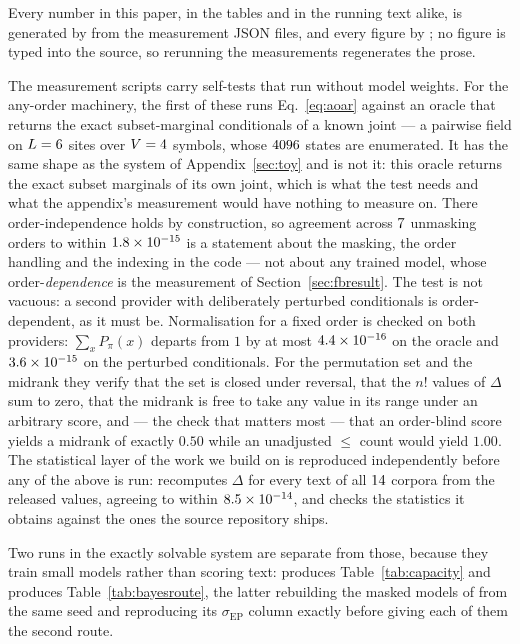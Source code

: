 \documentclass[11pt]{article}
\newcommand{\sigEP}{\sigma_{\mathrm{EP}}}
\begin{document}
Every number in this paper, in the tables and in the running text alike, is
generated by  from the measurement JSON files, and every
figure by ; no figure is typed into the source, so
rerunning the measurements regenerates the prose.

The measurement scripts carry self-tests that run without model weights.
For the any-order machinery, the first of these runs
Eq.~\eqref{eq:aoar} against an oracle that returns the exact
subset-marginal conditionals of a known joint --- a pairwise field on $L =
6$ sites over $V = 4$ symbols, whose $4096$ states are
enumerated.  It has the same shape as the system of
Appendix~\ref{sec:toy} and is not it: this oracle returns the exact subset
marginals of its own joint, which is what the test needs and what the
appendix's measurement would have nothing to measure on.  There
order-independence holds by construction, so agreement across
$7$ unmasking orders to within $1.8\times10^{-15}$ is a statement
about the
masking, the order handling and the indexing in the code --- not about any
trained model, whose order-\emph{dependence} is the measurement of
Section~\ref{sec:fbresult}.  The test is not vacuous: a second provider
with deliberately perturbed conditionals is order-dependent, as it must be.
Normalisation for a fixed order is checked on both providers: $\sum_x
P_\pi(x)$ departs from $1$ by at most $4.4\times10^{-16}$ on the oracle and
$3.6\times10^{-15}$ on the perturbed conditionals.  For the
permutation set and the midrank they verify that the set is closed under
reversal,
that the $n!$ values of $\Delta$ sum to zero, that the midrank is free to take
any value in its range under an arbitrary score, and --- the check that matters
most --- that an order-blind score yields a midrank of exactly $0.50$ while
an unadjusted $\le$ count would yield $1.00$.  The statistical layer of the
work we build on is reproduced independently before any of the above is run:
 recomputes $\Delta$ for every text of all
$14$ corpora from the released values, agreeing to within
$8.5\times10^{-14}$, and  checks the statistics it
obtains against the ones the source repository ships.

Two runs in the exactly solvable system are separate from those, because they
train small models rather than scoring text:  produces
Table~\ref{tab:capacity} and  produces
Table~\ref{tab:bayesroute}, the latter rebuilding the masked models of
 from the same seed and reproducing its $\sigEP$
column exactly before giving each of them the second route.
\end{document}

